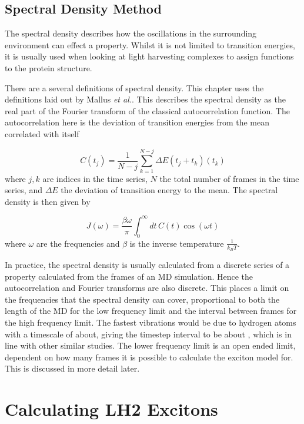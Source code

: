 \subsection{Spectral Density Method}
\label{subsec:spec_dens}

The spectral density describes how the oscillations in the surrounding environment 
can effect a property. Whilst it is not limited to transition energies, it is usually
used when looking at light harvesting complexes to assign functions to the protein
structure. 

There are a several definitions of spectral density. This chapter uses the definitions
laid out by Mallus \emph{et al.}. This describes the spectral density
as the real part of the Fourier transform of the classical autocorrelation function.
The autocorrelation here is the deviation of transition energies from the mean correlated
with itself

\begin{equation}
    C\left(t_j\right) = \frac{1}{N-j} \sum^{N-j}_{k=1} \Delta E \left(t_j + t_k\right) \left(t_k\right)
\end{equation}
%
where $j,k$ are indices in the time series, $N$ the total number of frames in the
time series, and $\Delta E$ the deviation of transition energy to the mean. The
spectral density is then given by

\begin{equation}
    J\left(\omega\right) = \frac{\beta \omega}{\pi} \int^\infty_0 dt \, C\left(t\right) \cos \left(\omega t\right)
\end{equation}
%
where $\omega$ are the frequencies and $\beta$ is the inverse temperature $\frac{1}{k_B T}$.

In practice, the spectral density is usually calculated from a discrete series of 
a property calculated from the frames of an MD simulation. Hence the autocorrelation
and Fourier transforms are also discrete. This places a limit on the frequencies 
that the spectral density can cover, proportional to both the length of the MD
for the low frequency limit and the interval between frames for the high frequency
limit. The fastest vibrations would be due to hydrogen atoms with a timescale of 
about, giving the timestep interval to be about , which is in line with other similar
studies. The lower frequency limit is an open ended limit, dependent on how many
frames it is possible to calculate the exciton model for. This is discussed in more
detail later.

\section{Calculating LH2 Excitons}
\label{sec:MD}

